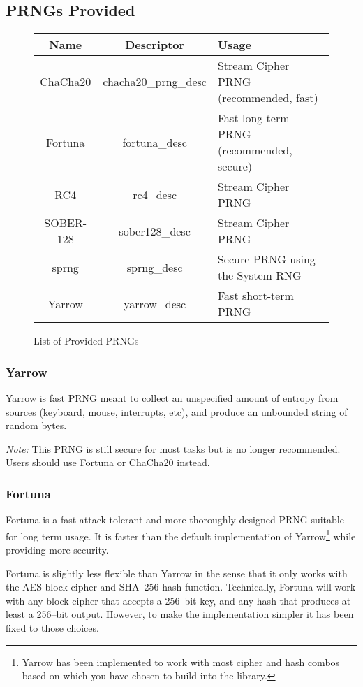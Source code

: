 \documentclass[synpaper]{book}
\begin{document}
\subsection{PRNGs Provided}
\begin{figure}[H]
\begin{center}
\begin{small}
\begin{tabular}{|c|c|l|}
\hline \textbf{Name} & \textbf{Descriptor} & \textbf{Usage} \\
\hline ChaCha20 & chacha20\_prng\_desc & Stream Cipher PRNG (recommended, fast) \\
\hline Fortuna & fortuna\_desc & Fast long-term PRNG (recommended, secure) \\
\hline RC4 & rc4\_desc & Stream Cipher PRNG \\
\hline SOBER-128 & sober128\_desc & Stream Cipher PRNG \\
\hline sprng & sprng\_desc & Secure PRNG using the System RNG \\
\hline Yarrow & yarrow\_desc & Fast short-term PRNG \\
\hline
\end{tabular}
\end{small}
\end{center}
\caption{List of Provided PRNGs}
\end{figure}

\subsubsection{Yarrow}
Yarrow is fast PRNG meant to collect an unspecified amount of entropy from sources
(keyboard, mouse, interrupts, etc), and produce an unbounded string of random bytes.

\textit{Note:} This PRNG is still secure for most tasks but is no longer recommended.  Users
should use Fortuna or ChaCha20 instead.

\subsubsection{Fortuna}

Fortuna is a fast attack tolerant and more thoroughly designed PRNG suitable for long term
usage.  It is faster than the default implementation of Yarrow\footnote{Yarrow has been implemented
to work with most cipher and hash combos based on which you have chosen to build into the library.} while
providing more security.

Fortuna is slightly less flexible than Yarrow in the sense that it only works with the AES block cipher
and SHA--256 hash function.  Technically, Fortuna will work with any block cipher that accepts a 256--bit
key, and any hash that produces at least a 256--bit output.  However, to make the implementation simpler
it has been fixed to those choices.
\end{document}
